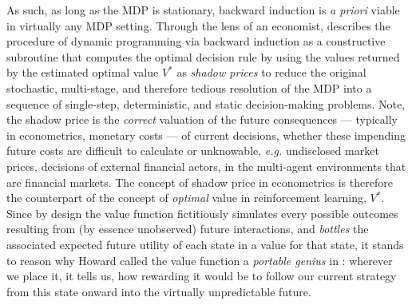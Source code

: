 As such, as long as the MDP is stationary, backward induction is \textit{a priori} viable in
virtually any MDP setting.
Through the lens of an economist, \cite{Rust1994-iw}
describes the procedure of dynamic programming via backward induction
as a constructive subroutine that computes the optimal decision rule by
using the values returned by the estimated optimal value $V^*$ as \emph{shadow prices}
to reduce the original stochastic, multi-stage, and therefore tedious resolution of the MDP
into a sequence of single-step, deterministic, and static decision-making problems.
Note, the shadow price is the \emph{correct} valuation of the future consequences --- typically in econometrics,
monetary costs ---
of current decisions, whether these impending future costs are difficult to calculate or
unknowable, \textit{e.g.} undisclosed market prices, decisions of external financial actors, in the
multi-agent environments that are financial markets.
The concept of shadow price in econometrics is therefore the counterpart of the concept of \emph{optimal} value
in reinforcement learning, $V^*$.
Since by design the value function fictitiously simulates every possible outcomes resulting from
(by essence unobserved) future interactions, and \emph{bottles} the associated expected future utility of each state
in a value for that state, it stands to reason why Howard
called the value function a \textit{portable genius} in \cite{Howard1971-ar}:
wherever we place it, it tells us,
how rewarding it would be to follow our current strategy from this state onward into the
virtually unpredictable future.

